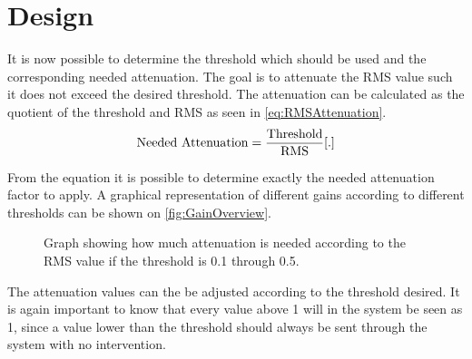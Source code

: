 \section{Design}
It is now possible to determine the threshold which should be used and the corresponding needed attenuation. The goal is to attenuate the RMS value such it does not exceed the desired threshold. The attenuation can be calculated as the quotient of the threshold and RMS as seen in \autoref{eq:RMSAttenuation}.
\begin{equation}\label{eq:RMSAttenuation}
\text{Needed Attenuation} = \frac{\text{Threshold}}{\text{RMS}} \enhed{.}
\end{equation}

From the equation it is possible to determine exactly the needed attenuation factor to apply. A graphical representation of different gains according to different thresholds can be shown on \autoref{fig:GainOverview}.

\begin{figure}[H]
\centering
{}

\caption{Graph showing how much attenuation is needed according to the RMS value if the threshold is 0.1 through 0.5.}
\label{fig:GainOverview}
\end{figure}

The attenuation values can the be adjusted according to the threshold desired. It is again important to know that every value above 1 will in the system be seen as 1, since a value lower than the threshold should always be sent through the system with no intervention.  


